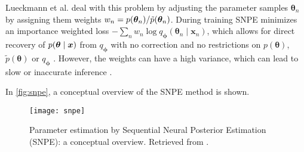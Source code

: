 Lueckmann et al. deal with this problem by adjusting the parameter samples $\bm{\theta}_n$ by assigning them weights $w_n = p \qty(\bm{\theta}_n)/ \tilde{p} \qty(\bm{\theta}_n)$. During training SNPE minimizes an importance weighted loss $- \sum_n w_n \log q_{\bm{\phi}}(\bm{\theta}_n \mid \bm{x}_n)$, which allows for direct recovery of $p \qty(\bm{\theta} \mid \bm{x})$ from $q_{\bm{\phi}}$ with no correction and no restrictions on $p(\bm{\theta})$, $\tilde{p}(\bm{\theta})$ or $q_{\bm{\phi}}$ \cite{apt}. However, the weights can have a high variance, which can lead to slow or inaccurate inference \cite{SNL18}.
  
In \autoref{fig:snpe}, a conceptual overview of the SNPE method is shown.

\begin{figure}[H]
\begin{center}\texttt{[image: snpe]}
\end{center}
\caption{Parameter estimation by Sequential Neural Posterior Estimation (SNPE): a conceptual overview. Retrieved from \cite[Figure 1]{SNPE19}.}
\label{fig:snpe}
\end{figure}









    


